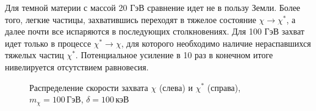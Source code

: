 Для темной материи с массой 20 ГэВ сравнение идет не в пользу Земли. Более того, легкие частицы, захватившись переходят в тяжелое состояние $\chi \rightarrow \chi^*$, а далее почти все испаряются в последующих столкновениях. Для 100 ГэВ захват идет только в процессе  $\chi^* \rightarrow \chi$, для которого необходимо наличие нераспавшихся тяжелых частиц $\chi^*$. Потенциальное усиление в 10 раз в конечном итоге нивелируется отсутствием равновесия.


\begin{figure}[!h]
\caption{ Распределение скорости захвата $\chi$ (слева) и $\chi^*$ (справа), $m_{\chi} = 100 \, \text{ГэВ}$, $\delta = 100 \, \text{кэВ}$}
\label{plot:C_L_100_100}
\end{figure}

